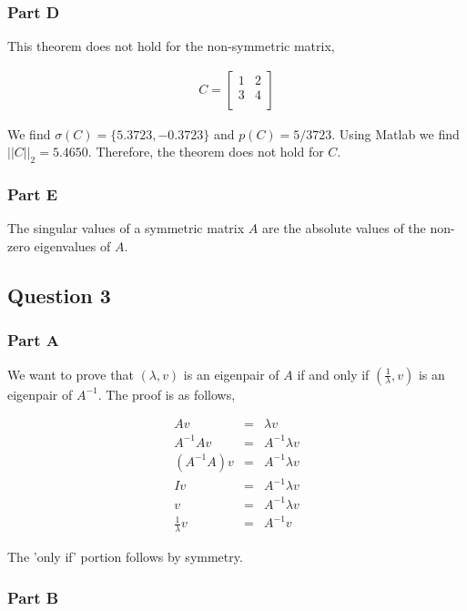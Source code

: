\subsubsection{Part D}

This theorem does not hold for the non-symmetric matrix,

\begin{eqnarray}
  C = 
  \begin{bmatrix}
    1 & 2 \\
    3 & 4 \\
  \end{bmatrix}
\end{eqnarray}

We find \(\sigma(C) = \{5.3723, -0.3723\}\) and \(p(C) = 5/3723\).
Using Matlab we find \(||C||_2 = 5.4650\).
Therefore, the theorem does not hold for \(C\).

\subsubsection{Part E}

The singular values of a symmetric matrix \(A\) are the absolute values of the non-zero eigenvalues of \(A\).

\newpage
\subsection{Question 3}
\subsubsection{Part A}

We want to prove that \((\lambda,v)\) is an eigenpair of \(A\) if and only if \((\frac{1}{\lambda},v)\) is an eigenpair of \(A^{-1}\).
The proof is as follows,

\begin{eqnarray}
  Av &=& \lambda v \\
  A^{-1}Av &=& A^{-1}\lambda v \\
  (A^{-1}A)v &=& A^{-1}\lambda v \\
  Iv &=& A^{-1}\lambda v \\
  v &=& A^{-1}\lambda v \\
  \frac{1}{\lambda}v &=& A^{-1}v
\end{eqnarray}

The 'only if' portion follows by symmetry.

\subsubsection{Part B}

